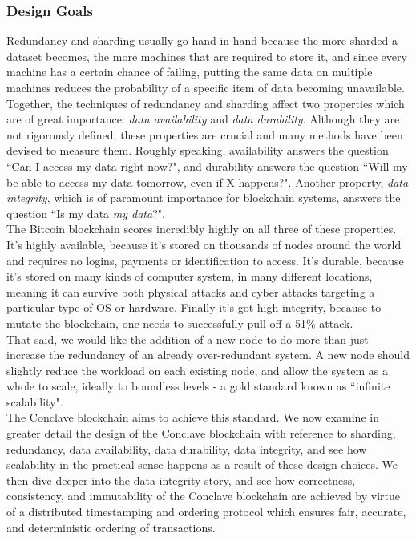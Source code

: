 \documentclass{report}
\begin{document}
			\subsubsection{Design Goals}
				Redundancy and sharding  usually go hand-in-hand because the more sharded a dataset becomes, the more machines that are required to store it, and since every machine has a certain chance of failing, putting the same data on multiple machines reduces the probability  of a specific item of data becoming unavailable. \\

				Together, the techniques of redundancy and sharding affect two properties which are of great importance: \textit{data availability} and \textit{data durability}. Although they are not rigorously defined, these properties are crucial and many methods have been devised to measure them. Roughly speaking, availability answers the question ``Can I access my data right now?", and durability answers the question ``Will my be able to access my data tomorrow, even if X happens?". Another property, \textit{data integrity}, which is of paramount importance for blockchain systems, answers the question ``Is my data \textit{my data}?". \\

				The Bitcoin blockchain scores incredibly highly on all three of these properties. It's highly available, because it's stored on thousands of nodes around the world and requires no logins, payments or identification to access. It's durable, because it's stored on many kinds of computer system, in many different locations, meaning it can survive both physical attacks and cyber attacks targeting a particular type of OS or hardware. Finally it's got high integrity, because to mutate  the blockchain, one needs to successfully pull off a 51\% attack. \\

				That said, we would like the addition of a new node to do more than just increase the redundancy of an already over-redundant system. A new node should slightly reduce the workload on each existing node, and allow the system as a whole to scale, ideally to boundless levels - a gold standard known as ``infinite scalability". \\

				The Conclave blockchain aims to achieve this standard. We now examine in greater detail the design of the Conclave blockchain with reference to sharding,  redundancy,  data availability,  data durability,  data integrity,  and see how scalability  in the practical sense happens as a result of these design choices. We then dive deeper into the data integrity story, and see how correctness, consistency, and immutability of the Conclave blockchain are achieved by virtue of a distributed timestamping and ordering protocol which ensures fair, accurate, and deterministic ordering of transactions.
\end{document}
